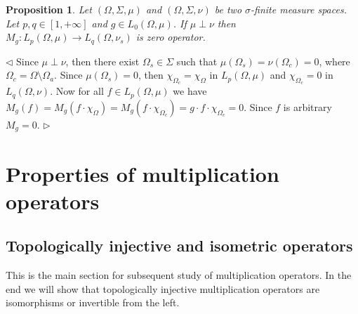 \documentclass[12pt]{article}
\newtheorem{proposition}[theorem]{Proposition}
\newenvironment{proof}{\par $\triangleleft$}{$\triangleright$}
\begin{document}
\begin{proposition}\label{MultOpCharacBtwnTwoSingMeasSp} Let $(\Omega,\Sigma,\mu)$ and $(\Omega,\Sigma,\nu)$ be two $\sigma$-finite measure spaces. Let $p,q\in[1,+\infty]$ and $g\in L_0(\Omega,\mu)$. If $\mu\perp\nu$ then $M_g:L_p(\Omega,\mu)\to L_q(\Omega,\nu_s)$ is zero operator.
\end{proposition}
\begin{proof} Since $\mu\perp\nu$, then there exist $\Omega_s\in\Sigma$ such that $\mu(\Omega_s)=\nu(\Omega_c)=0$, where $\Omega_c=\Omega\setminus\Omega_a$. Since $\mu(\Omega_s)=0$, then $\chi_{\Omega_c}=\chi_{\Omega}$ in $L_p(\Omega,\mu)$ and $\chi_{\Omega_c}=0$ in $L_q(\Omega,\nu)$. Now for all $f\in L_p(\Omega,\mu)$ we have $M_g(f)=M_g(f\cdot \chi_{\Omega})=M_g(f\cdot \chi_{\Omega_c})=g\cdot f\cdot\chi_{\Omega_c}=0$. Since $f$ is arbitrary $M_g=0$.
\end{proof}









\section{Properties of multiplication operators}

\subsection{Topologically injective and isometric operators}

This is the main section for subsequent study of multiplication operators. In the end we will show that topologically injective multiplication operators are isomorphisms or invertible from the left.
\end{document}
